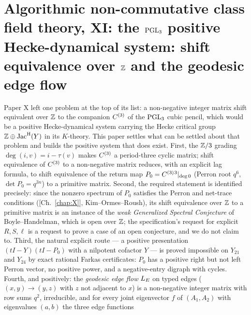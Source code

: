 \chapter[\texorpdfstring{XI. The $\PGL_3$ positive Hecke-dynamical system: shift equivalence over $\Z$ and the geodesic
edge flow}{XI. The PGL3 positive Hecke-dynamical system: shift equivalence over Z and the geodesic edge flow}]{\texorpdfstring{Algorithmic non-commutative class field theory, XI: the $\PGL_3$ positive Hecke-dynamical system: shift equivalence over $\Z$ and the geodesic
edge flow}{Algorithmic non-commutative class field theory, XI: the PGL3 positive Hecke-dynamical system: shift equivalence over Z and the geodesic edge flow}}\label{chap:XI}
\begin{chapterabstract}
Paper X left one problem at the top of its list: a non-negative integer matrix shift
equivalent over $\Z$ to the companion $C^{(3)}$ of the $\PGL_3$ cubic pencil, which would be
a positive Hecke-dynamical system carrying the Hecke critical group $\mathbb{Z}\oplus\operatorname{Jac}^{\mathrm{H}}(Y)$ in its
$K$-theory. This paper settles what can be settled about that problem and builds the
positive system that does exist. First, the $\mathbb{Z}/3$ grading $\deg(i,v)=i-\tau(v)$ makes
$C^{(3)}$ a period-three cyclic matrix; shift equivalence of $C^{(3)}$ to a non-negative
matrix reduces, with an explicit lag formula, to shift equivalence of the return map
$P_0=C^{(3)}{}^{3}|_{\deg 0}$ (Perron root $q^{6}$, $\det P_0=q^{3n}$) to a primitive matrix.
Second, the required statement is identified precisely: since the nonzero spectrum of $P_0$
satisfies the Perron and net-trace conditions ([Ch.~\ref{chap:X}], Kim--Ormes--Roush), its shift
equivalence over $\Z$ to a primitive matrix is an instance of the \emph{weak Generalized
Spectral Conjecture} of Boyle--Handelman, which is open over $\Z$; the specification's
request for explicit $R,S,\ell$ is a request to prove a case of an open conjecture, and we
do not claim to. Third, the natural explicit route --- a positive presentation
$(tI-Y)(tI-P_0)$ with a nilpotent cofactor $Y$ --- is proved impossible on $Y_{21}$ and
$Y_{24}$ by exact rational Farkas certificates: $P_0$ has a positive right but not left
Perron vector, no positive power, and a negative-entry digraph with cycles. Fourth, and
positively: the \emph{geodesic edge flow} $L_E$ on typed edges ($(x,y)\to(y,z)$ with $z$ not
adjacent to $x$) is a non-negative integer matrix with row sums $q^{2}$, irreducible, and for
every joint eigenvector $f$ of $(A_1,A_2)$ with eigenvalues $(a,b)$ the three edge functions

\end{chapterabstract}
